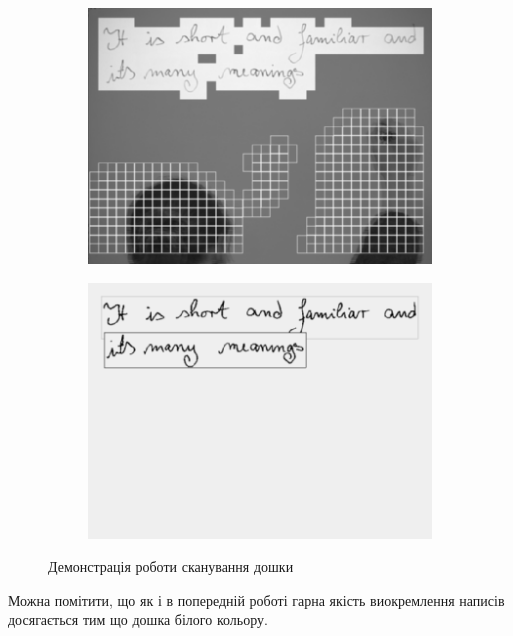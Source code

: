 \begin{figure}[h]
  \centering
  \begin{subfigure}[b]{0.3\textwidth}
    \centering
    \includegraphics[width=\textwidth]{images/wienecke_1}
  \end{subfigure}
  \begin{subfigure}[b]{0.3\textwidth}
    \centering
    \includegraphics[width=\textwidth]{images/wienecke_2}
  \end{subfigure}
  \label{fig:wienecke}
  \caption{Демонстрація роботи сканування дошки}
\end{figure}

Можна помітити, що як і в попередній роботі гарна якість виокремлення написів
досягається тим що дошка білого кольору.

